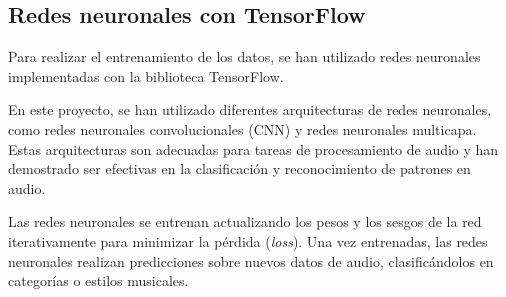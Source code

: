 \subsection{Redes neuronales con TensorFlow}

Para realizar el entrenamiento de los datos, se han utilizado redes neuronales implementadas con la biblioteca TensorFlow.

En este proyecto, se han utilizado diferentes arquitecturas de redes neuronales, como redes neuronales convolucionales (CNN) y redes neuronales multicapa. 
Estas arquitecturas son adecuadas para tareas de procesamiento de audio y han demostrado ser efectivas en la clasificación y reconocimiento de patrones en audio.

Las redes neuronales se entrenan actualizando los pesos y los sesgos de la red iterativamente para minimizar la pérdida (\textit{loss}). Una vez entrenadas, las redes neuronales realizan predicciones sobre nuevos datos de audio, clasificándolos en categorías o estilos musicales.